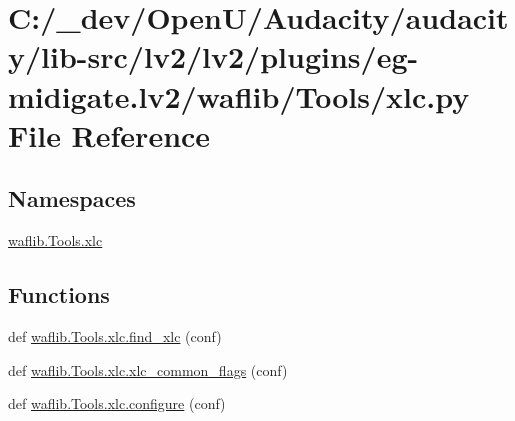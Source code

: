 \hypertarget{lv2_2plugins_2eg-midigate_8lv2_2waflib_2_tools_2xlc_8py}{}\section{C\+:/\+\_\+dev/\+Open\+U/\+Audacity/audacity/lib-\/src/lv2/lv2/plugins/eg-\/midigate.lv2/waflib/\+Tools/xlc.py File Reference}
\label{lv2_2plugins_2eg-midigate_8lv2_2waflib_2_tools_2xlc_8py}
\subsection*{Namespaces}
\begin{DoxyCompactItemize}
\item 
 \hyperlink{namespacewaflib_1_1_tools_1_1xlc}{waflib.\+Tools.\+xlc}
\end{DoxyCompactItemize}
\subsection*{Functions}
\begin{DoxyCompactItemize}
\item 
def \hyperlink{namespacewaflib_1_1_tools_1_1xlc_a826e1c437600d3c067bccbbd4064dec9}{waflib.\+Tools.\+xlc.\+find\+\_\+xlc} (conf)
\item 
def \hyperlink{namespacewaflib_1_1_tools_1_1xlc_ae679a412086a4361649983127db4039d}{waflib.\+Tools.\+xlc.\+xlc\+\_\+common\+\_\+flags} (conf)
\item 
def \hyperlink{namespacewaflib_1_1_tools_1_1xlc_ac8361aabba7f34ddea8a8e153d9d8315}{waflib.\+Tools.\+xlc.\+configure} (conf)
\end{DoxyCompactItemize}
